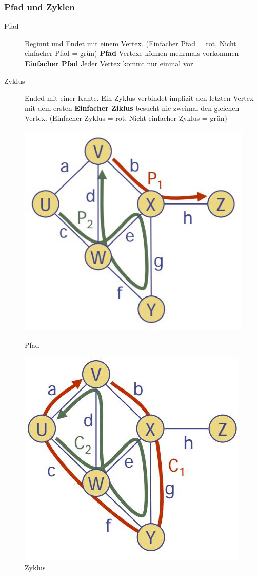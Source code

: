 \subsubsection{Pfad und Zyklen}
\begin{description}
	\item[Pfad] Beginnt und Endet mit einem Vertex. (Einfacher Pfad = rot, Nicht einfacher Pfad = grün)
	\subitem \textbf{Pfad} Vertexe können mehrmals vorkommen
	\subitem \textbf{Einfacher Pfad} Jeder Vertex kommt nur einmal vor
	\item[Zyklus] Ended mit einer Kante. Ein Zyklus verbindet implizit den letzten Vertex mit dem ersten 
	\subitem \textbf{Einfacher Ziklus} besucht nie zweimal den gleichen Vertex. (Einfacher Zyklus = rot, Nicht einfacher Zyklus = grün)
\end{description}
\begin{figure}[ht!]
	\centering
	\begin{minipage}[t]{0.4\textwidth}
		\centering
		\includegraphics[width=0.7\linewidth]{images/graph_pfad}
		\caption{Pfad}
		\label{fig:graphpfad}
	\end{minipage}
	\begin{minipage}[t]{0.4\textwidth}
		\centering
		\includegraphics[width=0.7\linewidth]{images/graph_zyklus}
		\caption{Zyklus}
		\label{fig:graphzyklus}
	\end{minipage}
\end{figure}

